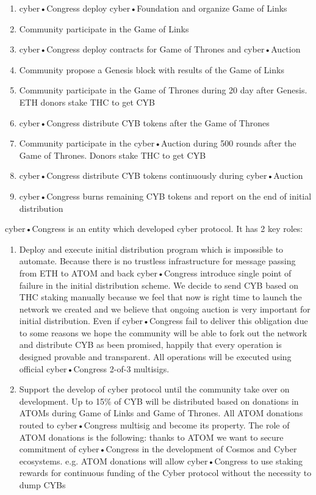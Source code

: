 \documentclass[8pt,oneside]{amsart}
\begin{document}
\begin{enumerate}
 \item cyber•Congress deploy cyber•Foundation and organize Game of Links
 \item Community participate in the Game of Links
 \item cyber•Congress deploy contracts for Game of Thrones and cyber•Auction
 \item Community propose a Genesis block with results of the Game of Links
 \item Community participate in the Game of Thrones during 20 day after Genesis. ETH donors stake THC to get CYB
 \item cyber•Congress distribute CYB tokens after the Game of Thrones
 \item Community participate in the cyber•Auction during 500 rounds after the Game of Thrones. Donors stake THC to get CYB
 \item cyber•Congress distribute CYB tokens continuously during cyber•Auction
 \item cyber•Congress burns remaining CYB tokens and report on the end of initial distribution
\end{enumerate}

cyber•Congress is an entity which developed cyber protocol. It has 2 key roles:
\begin{enumerate}
 \item Deploy and execute initial distribution program which is impossible to automate. Because there is no trustless infrastructure for message passing from ETH to ATOM and back cyber•Congress introduce single point of failure in the initial distribution scheme. We decide to send CYB based on THC staking manually because we feel that now is right time to launch the network we created and we believe that ongoing auction is very important for initial distribution. Even if cyber•Congress fail to deliver this obligation due to some reasons we hope the community will be able to fork out the network and distribute CYB as been promised, happily that every operation is designed provable and transparent. All operations will be executed using official cyber•Congress 2-of-3 multisigs.
 \item Support the develop of cyber protocol until the community take over on development. Up to 15\% of CYB will be distributed based on donations in ATOMs during Game of Links and Game of Thrones. All ATOM donations routed to cyber•Congress multisig and become its property. The role of ATOM donations is the following: thanks to ATOM we want to secure commitment of cyber•Congress in the development of Cosmos and Cyber ecosystems. e.g. ATOM donations will allow cyber•Congress to use staking rewards for continuous funding of the Cyber protocol without the necessity to dump CYBs
\end{enumerate}
\end{document}
